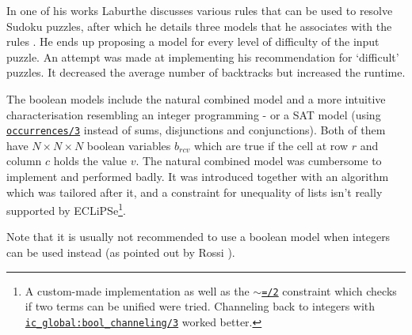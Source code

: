 In one of his works Laburthe discusses various rules that can be used to resolve Sudoku puzzles, after which he details three models that he associates with the rules \cite{article:laburthe}. He ends up proposing a model for every level of difficulty of the input puzzle. An attempt was made at implementing his recommendation for `difficult' puzzles. It decreased the average number of backtracks but increased the runtime. \\\par

The boolean models include the natural combined model \cite{article:natural} and a more intuitive characterisation resembling an integer programming - or a SAT model \cite{article:sat} (using \href{http://eclipseclp.org/doc/bips/lib/ic_global/occurrences-3.html}{\texttt{occurrences/3}} instead of sums, disjunctions and conjunctions). Both of them have $N\times N\times N$ boolean variables $b_{rcv}$ which are true if the cell at row $r$ and column $c$ holds the value $v$. The natural combined model was cumbersome to implement and performed badly. It was introduced together with an algorithm which was tailored after it, and a constraint for unequality of lists isn't really supported by ECLiPSe\footnote{A custom-made implementation as well as the \href{https://eclipseclp.org/doc/bips/kernel/termcomp/TE-2.html}{\texttt{$\sim$=/2}} constraint which checks if two terms can be unified were tried. Channeling back to integers with \href{http://eclipseclp.org/doc/bips/lib/ic_global/bool_channeling-3.html}{\texttt{ic\_global:bool\_channeling/3}} worked better.}.\par
Note that it is usually not recommended to use a boolean model when integers can be used instead (as pointed out by Rossi \cite{book:rossi}).\\\par

